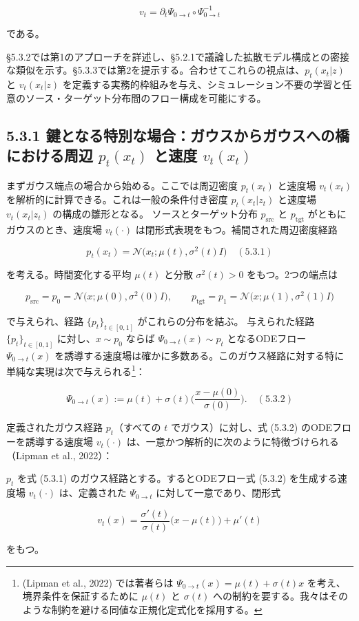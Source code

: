 \[
v_t=\partial_t\Psi_{0\to t}\circ\Psi_{0\to t}^{-1}
\]

  である。

§5.3.2では第1のアプローチを詳述し、§5.2.1で議論した拡散モデル構成との密接な類似を示す。§5.3.3では第2を提示する。合わせてこれらの視点は、$p_t(x_t|z)$ と $v_t(x_t|z)$ を定義する実務的枠組みを与え、シミュレーション不要の学習と任意のソース・ターゲット分布間のフロー構成を可能にする。

\subsection*{5.3.1 鍵となる特別な場合：ガウスからガウスへの橋における周辺 $p_t(x_t)$ と速度 $v_t(x_t)$}


まずガウス端点の場合から始める。ここでは周辺密度 $p_t(x_t)$ と速度場 $v_t(x_t)$ を解析的に計算できる。これは一般の条件付き密度 $p_t(x_t|z_t)$ と速度場 $v_t(x_t|z_t)$ の構成の雛形となる。
ソースとターゲット分布 $p_{\mathrm{src}}$ と $p_{\mathrm{tgt}}$ がともにガウスのとき、速度場 $v_t(\cdot)$ は閉形式表現をもつ。補間された周辺密度経路

\[
p_t(x_t)=\mathcal{N}\bigl(x_t;\mu(t),\sigma^2(t)I\bigr) \quad (5.3.1)
\]


を考える。時間変化する平均 $\mu(t)$ と分散 $\sigma^2(t)>0$ をもつ。2つの端点は

\[
p_{\mathrm{src}}=p_0=\mathcal{N}\bigl(x;\mu(0),\sigma^2(0)I\bigr),\qquad
p_{\mathrm{tgt}}=p_1=\mathcal{N}\bigl(x;\mu(1),\sigma^2(1)I\bigr)
\]


で与えられ、経路 $\{p_t\}_{t\in[0,1]}$ がこれらの分布を結ぶ。
与えられた経路 $\{p_t\}_{t\in[0,1]}$ に対し、$x\sim p_0$ ならば $\Psi_{0\to t}(x)\sim p_t$ となるODEフロー $\Psi_{0\to t}(x)$ を誘導する速度場は確かに多数ある。このガウス経路に対する特に単純な実現は次で与えられる\footnote{(Lipman et al., 2022) では著者らは $\Psi_{0\to t}(x)=\mu(t)+\sigma(t)x$ を考え、境界条件を保証するために $\mu(t)$ と $\sigma(t)$ への制約を要する。我々はそのような制約を避ける同値な正規化定式化を採用する。}：

\[
\Psi_{0\to t}(x):=\mu(t)+\sigma(t)\Biggl(\frac{x-\mu(0)}{\sigma(0)}\Biggr). \quad (5.3.2)
\]


定義されたガウス経路 $p_t$（すべての $t$ でガウス）に対し、式 (5.3.2) のODEフローを誘導する速度場 $v_t(\cdot)$ は、一意かつ解析的に次のように特徴づけられる（Lipman et al., 2022）：


\begin{propositionbox}[命題 5.3.1（ガウス密度経路に対する閉形式速度場）]
$p_t$ を式 (5.3.1) のガウス経路とする。するとODEフロー式 (5.3.2) を生成する速度場 $v_t(\cdot)$ は、定義された $\Psi_{0\to t}$ に対して一意であり、閉形式

\[
v_t(x)=\frac{\sigma'(t)}{\sigma(t)}\bigl(x-\mu(t)\bigr)+\mu'(t)
\]

をもつ。
\end{propositionbox}


